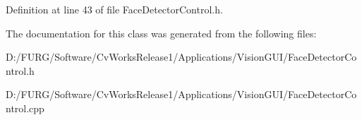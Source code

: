 Definition at line 43 of file Face\+Detector\+Control.\+h.



The documentation for this class was generated from the following files\+:\begin{DoxyCompactItemize}
\item 
D\+:/\+F\+U\+R\+G/\+Software/\+Cv\+Works\+Release1/\+Applications/\+Vision\+G\+U\+I/Face\+Detector\+Control.\+h\item 
D\+:/\+F\+U\+R\+G/\+Software/\+Cv\+Works\+Release1/\+Applications/\+Vision\+G\+U\+I/Face\+Detector\+Control.\+cpp\end{DoxyCompactItemize}
